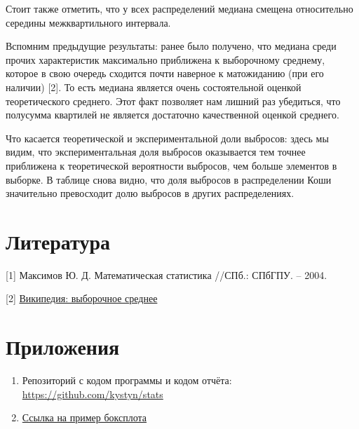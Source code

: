 Стоит также отметить, что у всех распределений медиана смещена относительно середины межквартильного интервала. 

Вспомним предыдущие результаты: ранее было получено, что медиана среди прочих характеристик максимально приближена к выборочному среднему, которое в свою очередь сходится почти наверное к матожиданию (при его наличии) [2]. То есть медиана является очень состоятельной оценкой теоретического среднего. Этот факт позволяет нам лишний раз убедиться, что полусумма квартилей не является достаточно качественной оценкой среднего.

Что касается теоретической и экспериментальной доли выбросов: здесь мы видим, что экспериментальная доля выбросов оказывается тем точнее приближена к теоретической вероятности выбросов, чем больше элементов в выборке. В таблице снова видно, что доля выбросов в распределении Коши значительно превосходит долю выбросов в других распределениях.

\section{Литература}
[1] Максимов Ю. Д. Математическая статистика //СПб.: СПбГПУ. – 2004.

[2] \href{https://ru.wikipedia.org/wiki/%D0%92%D1%8B%D0%B1%D0%BE%D1%80%D0%BE%D1%87%D0%BD%D0%BE%D0%B5_%D1%81%D1%80%D0%B5%D0%B4%D0%BD%D0%B5%D0%B5}{Википедия: выборочное среднее}

\section{Приложения}

\begin{enumerate}
	\item Репозиторий с кодом программы и кодом отчёта: \href{https://github.com/kystyn/stats}{https://github.com/kystyn/stats}

	\item \href{https://towardsdatascience.com/understanding-boxplots-5e2df7bcbd51}{Ссылка на пример боксплота}\label{bplotex}
\end{enumerate}


